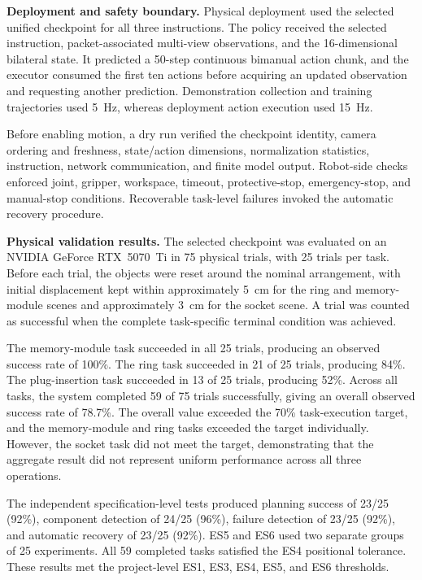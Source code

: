 \begin{digest}
\noindent\textbf{Deployment and safety boundary.}
Physical deployment used the selected unified checkpoint for all three instructions. The policy received the selected instruction, packet-associated multi-view observations, and the 16-dimensional bilateral state. It predicted a 50-step continuous bimanual action chunk, and the executor consumed the first ten actions before acquiring an updated observation and requesting another prediction. Demonstration collection and training trajectories used 5~Hz, whereas deployment action execution used 15~Hz.

Before enabling motion, a dry run verified the checkpoint identity, camera ordering and freshness, state/action dimensions, normalization statistics, instruction, network communication, and finite model output. Robot-side checks enforced joint, gripper, workspace, timeout, protective-stop, emergency-stop, and manual-stop conditions. Recoverable task-level failures invoked the automatic recovery procedure.

\noindent\textbf{Physical validation results.}
The selected checkpoint was evaluated on an NVIDIA GeForce RTX~5070~Ti in 75 physical trials, with 25 trials per task. Before each trial, the objects were reset around the nominal arrangement, with initial displacement kept within approximately 5~cm for the ring and memory-module scenes and approximately 3~cm for the socket scene. A trial was counted as successful when the complete task-specific terminal condition was achieved.

The memory-module task succeeded in all 25 trials, producing an observed success rate of 100\%. The ring task succeeded in 21 of 25 trials, producing 84\%. The plug-insertion task succeeded in 13 of 25 trials, producing 52\%. Across all tasks, the system completed 59 of 75 trials successfully, giving an overall observed success rate of 78.7\%. The overall value exceeded the 70\% task-execution target, and the memory-module and ring tasks exceeded the target individually. However, the socket task did not meet the target, demonstrating that the aggregate result did not represent uniform performance across all three operations.

The independent specification-level tests produced planning success of 23/25 (92\%), component detection of 24/25 (96\%), failure detection of 23/25 (92\%), and automatic recovery of 23/25 (92\%). ES5 and ES6 used two separate groups of 25 experiments. All 59 completed tasks satisfied the ES4 positional tolerance. These results met the project-level ES1, ES3, ES4, ES5, and ES6 thresholds.


\end{digest}
